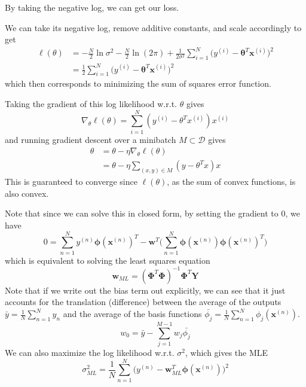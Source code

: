   By taking the negative log, we can get our loss.  

  \begin{definition}
    We can take its negative log, remove additive constants, and scale accordingly to get 
    \begin{align}
      \ell (\theta) & = -\frac{N}{2} \ln{\sigma^2} - \frac{N}{2} \ln(2 \pi) + \frac{1}{2 \sigma^2} \sum_{i=1}^N \big(y^{(i)} - \boldsymbol{\theta}^T \mathbf{x}^{(i)} \big)^2 \\
      & =\frac{1}{2} \sum_{i=1}^N \big(y^{(i)} - \boldsymbol{\theta}^T \mathbf{x}^{(i)} \big)^2 
    \end{align}
    which then corresponds to minimizing the sum of squares error function. 
  \end{definition}

  \begin{theorem}
    Taking the gradient of this log likelihood w.r.t. $\theta$ gives 
    \[\nabla_\theta \ell (\theta) = \sum_{i=1}^N ( y^{(i)} - \theta^T x^{(i)}) x^{(i)} \]
    and running gradient descent over a minibatch $M \subset \mathcal{D}$ gives 
    \begin{align*}
        \theta & = \theta - \eta \nabla_\theta \ell (\theta) \\
        & = \theta - \eta \sum_{(x, y) \in M} (y - \theta^T x) x
    \end{align*}
    This is guaranteed to converge since $\ell(\theta)$, as the sum of convex functions, is also convex. 

    Note that since we can solve this in closed form, by setting the gradient to $0$, we have 
    \[0 = \sum_{n=1}^N y^{(n)} \boldsymbol{\phi}(\mathbf{x}^{(n)})^T - \mathbf{w}^T \bigg( \sum_{n=1}^N \boldsymbol{\phi}(\mathbf{x}^{(n)}) \boldsymbol{\phi}(\mathbf{x}^{(n)})^T \bigg)\]
    which is equivalent to solving the least squares equation 
    \[\mathbf{w}_{ML} = ( \boldsymbol{\Phi}^T \boldsymbol{\Phi})^{-1} \boldsymbol{\Phi}^T \mathbf{Y}\]
    Note that if we write out the bias term out explicitly, we can see that it just accounts for the translation (difference) between the average of the outputs $\bar{y} = \frac{1}{N} \sum_{n=1}^N y_n$ and the average of the basis functions $\bar{\phi_j} = \frac{1}{N} \sum_{n=1}^N \phi_j (\mathbf{x}^{(n)})$. 
    \[w_0 = \bar{y} - \sum_{j=1}^{M-1} w_j \bar{\phi_j}\]
    We can also maximize the log likelihood w.r.t. $\sigma^2$, which gives the MLE 
    \[\sigma^2_{ML} = \frac{1}{N} \sum_{n=1}^N \big( y^{(n)} - \mathbf{w}^T_{ML} \boldsymbol{\phi}(\mathbf{x}^{(n)}) \big)^2\]
  \end{theorem}


